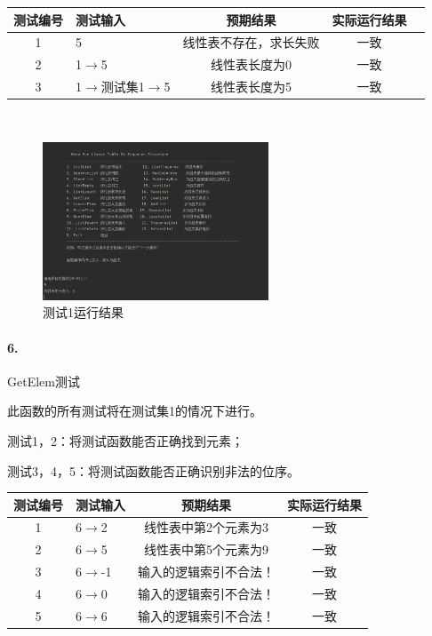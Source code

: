 \documentclass[supercite]{Experimental_Report}
\theoremstyle{definition}
\begin{document}
\begin{tabular}{|c|l|c|c|c|}
	\hline
	测试编号 & 测试输入 & 预期结果 & 实际运行结果 \\
	\hline
	1 & 5 & 线性表不存在，求长失败 & 一致 \\
	\hline
	2 & 1$\rightarrow$5 & 线性表长度为0 & 一致 \\
	\hline
	3 & 1$\rightarrow$测试集1$\rightarrow$5 & 线性表长度为5 & 一致 \\
	\hline
\end{tabular}

~\

 \begin{figure}[H]
 	\centering
 	\includegraphics[width=0.6\textwidth]{images/线性表测试5.png}
 	\caption{测试1运行结果}
 	\label{txlab}
 \end{figure}


\paragraph{ 6.}GetElem测试

此函数的所有测试将在测试集1的情况下进行。

测试1，2：将测试函数能否正确找到元素；

测试3，4，5：将测试函数能否正确识别非法的位序。

\vspace{0.5em}

\begin{tabular}{|c|l|c|c|}
	\hline
	测试编号 & 测试输入 & 预期结果 & 实际运行结果 \\
	\hline
	1 & 6$\rightarrow$2 & 线性表中第2个元素为3 & 一致 \\
	\hline
	2 & 6$\rightarrow$5 & 线性表中第5个元素为9 & 一致 \\
	\hline
	3 & 6$\rightarrow$-1 & 输入的逻辑索引不合法！ & 一致 \\
	\hline
	4 & 6$\rightarrow$0 & 输入的逻辑索引不合法！ & 一致 \\
	\hline
	5 & 6$\rightarrow$6 & 输入的逻辑索引不合法！ & 一致 \\
	\hline
\end{tabular}
\end{document}

